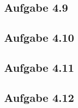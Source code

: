 \documentclass{standalone}
\begin{document}
 

\subsection{Aufgabe 4.9}

\subsection{Aufgabe 4.10}

\subsection{Aufgabe 4.11}

\subsection{Aufgabe 4.12}
\end{document}
